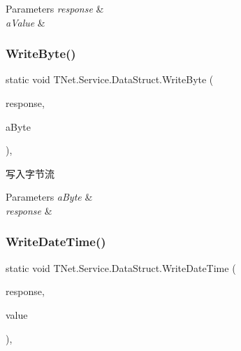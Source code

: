 \begin{DoxyParams}{Parameters}
{\em response} & \\
\hline
{\em a\+Value} & \\
\hline
\end{DoxyParams}
\mbox{\label{class_t_net_1_1_service_1_1_data_struct_ad6cfebd4f64edd86ca479c3c418fb5bc}} 
\subsubsection{\texorpdfstring{Write\+Byte()}{WriteByte()}}
{\footnotesize\ttfamily static void T\+Net.\+Service.\+Data\+Struct.\+Write\+Byte (\begin{DoxyParamCaption}\item[{\mbox{\hyperlink{class_t_net_1_1_service_1_1_base_game_response}{Base\+Game\+Response}}}]{response,  }\item[{byte}]{a\+Byte }\end{DoxyParamCaption})\hspace{0.3cm}{\ttfamily [static]}, {\ttfamily [protected]}}



写入字节流 


\begin{DoxyParams}{Parameters}
{\em a\+Byte} & \\
\hline
{\em response} & \\
\hline
\end{DoxyParams}
\mbox{\label{class_t_net_1_1_service_1_1_data_struct_a9d893adad23db1b2365bc57ec552cc1b}} 
\subsubsection{\texorpdfstring{Write\+Date\+Time()}{WriteDateTime()}}
{\footnotesize\ttfamily static void T\+Net.\+Service.\+Data\+Struct.\+Write\+Date\+Time (\begin{DoxyParamCaption}\item[{\mbox{\hyperlink{class_t_net_1_1_service_1_1_base_game_response}{Base\+Game\+Response}}}]{response,  }\item[{Date\+Time}]{value }\end{DoxyParamCaption})\hspace{0.3cm}{\ttfamily [static]}, {\ttfamily [protected]}}






